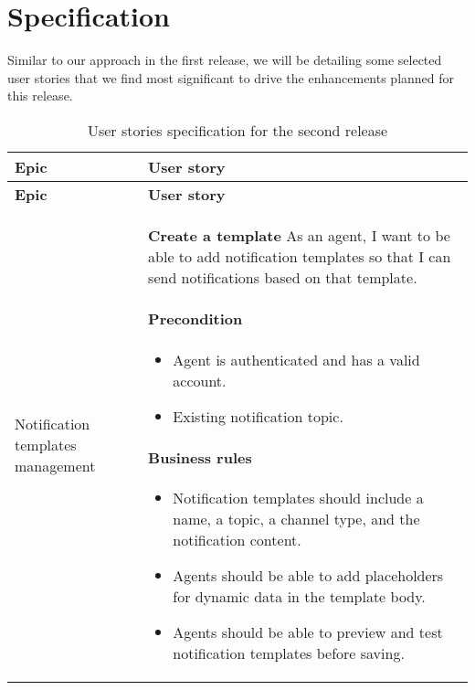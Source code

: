 \section{Specification}
Similar to our approach in the first release, we will be detailing some selected user stories that
we find most significant to drive the enhancements planned for this release.

\begin{longtable}{ | m{} | m{} | }
    \caption{User stories specification for the second release}                                                                                                                                                                                  \\
    \hline
    \textbf{Epic}                                       & \textbf{User story}                                                                                                                                                                    \\
    \hline
    \endfirsthead
    \hline
    \textbf{Epic}                                       & \textbf{User story}                                                                                                                                                                    \\
    \hline
    \endhead
    \endfoot
    \endlastfoot
    Notification \newline templates \newline management & \textbf{Create a template} \newline As an agent, I want to be able to add notification templates so that I can send notifications based on that template.

    \paragraph*{Precondition} \mbox{} \newline
    \begin{itemize}
        \item Agent is authenticated and has a valid account.
        \item Existing notification topic.
    \end{itemize}

    \paragraph*{Business rules} \mbox{} \newline
    \begin{itemize}
        \item Notification templates should include a name, a topic, a channel type, and the notification content.
        \item Agents should be able to add placeholders for dynamic data in the template body.
        \item Agents should be able to preview and test notification templates before saving.
    \end{itemize}

\end{longtable}
